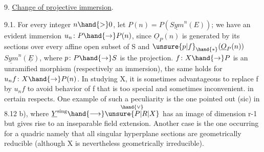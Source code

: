 
9. \uline{Change of projective immersion}.

9.1. For every integer $n \hand{>} 0$, let $P(n) = P(\underline{Sym}^n(E))$; we have an
evident immersion $u_n\colon P \hand{\to} P(n)$, since $\underline{O}_P(n)$ is generated by
its sections over every affine open subset of S and $\unsure{p|f}_{\hand{*}}(\underline{O}_P(n))$
$\underline{Sym}^n(\underline{E})$, where $p\colon P \hand{\to} S$ is the projection.  $f\colon X\hand{\to} P$ is an unramified
morphism (respectively an immersion), the same holds for $u_n f\colon X \hand{\to} P(n)$.
In studying X, it is sometimes advantageous to  replace f by $u_n f$ 
to avoid behavior of f that is too special and sometimes  inconvenient.
in certain respects. One example of such a peculiarity is the one
 pointed out (sic) in 8.12 b),  where $\underline{Y}^{\mathrm{sing}} \hand{\longrightarrow} \overset{\hand{\vee}}{\unsure{P|R|X}}$ has an image of
dimension r-1 but  gives rise to an inseparable
field extension. Another case is the one occurring for
a quadric  namely that
all singular hyperplane sections are geometrically
reducible (although X is nevertheless geometrically irreducible).

